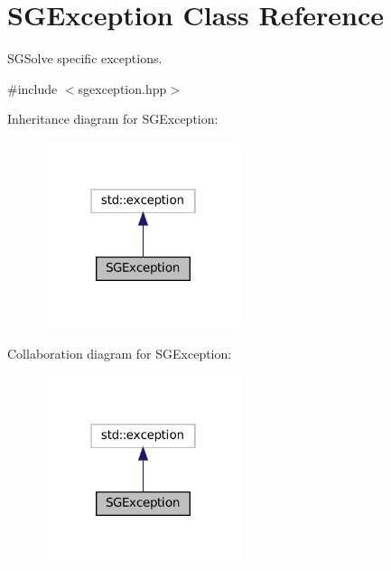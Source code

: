 \hypertarget{classSGException}{}\section{S\+G\+Exception Class Reference}
\label{classSGException}


S\+G\+Solve specific exceptions.  




{\ttfamily \#include $<$sgexception.\+hpp$>$}



Inheritance diagram for S\+G\+Exception\+:
\nopagebreak
\begin{figure}[H]
\begin{center}
\leavevmode
\includegraphics[width=166pt]{classSGException__inherit__graph}
\end{center}
\end{figure}


Collaboration diagram for S\+G\+Exception\+:
\nopagebreak
\begin{figure}[H]
\begin{center}
\leavevmode
\includegraphics[width=166pt]{classSGException__coll__graph}
\end{center}
\end{figure}
